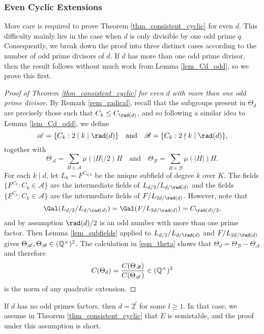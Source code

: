 \subsubsection{Even Cyclic Extensions}
More care is required to prove Theorem \ref{thm_consistent_cyclic} for even $d$. This difficulty mainly lies in the case when $d$ is only divisible by one odd prime $q$. Consequently, we break down the proof into three distinct cases according to the number of odd prime divisors of $d$. If $d$ has more than one odd prime divisor, then the result follows without much work from Lemma \ref{lem_Cd_odd}, so we prove this first.

\begin{proof}[Proof of Theorem \ref{thm_consistent_cyclic} for even $d$ with more than one odd prime divisor]
    By Remark \ref{rem_radical}, recall that the subgroups present in $\Theta_d$ are precisely those such that $C_k\leq C_{\rad(d)}$, and so following a similar idea to Lemma \ref{lem_Cd_odd}, we define
    $$\mathcal{A}=\{C_k :2\mid k\mid\rad(d)\}\quad\text{and}\quad\mathcal{B}=\{C_k:2\nmid k\mid\rad(d)\},$$
    together with
    $$\Theta_\mathcal{A}=\sum_{H\in\mathcal{A}}\mu(|H|/2)H\quad\text{and}\quad\Theta_\mathcal{B}=\sum_{H\in\mathcal{B}}\mu(|H|)H. $$ 
    For each $k\mid d$, let $L_k=F^{C_{d/k}}$ be the unique subfield of degree $k$ over $K$. The fields $\{F^{C_k}:C_k\in\mathcal{A}\}$ are the intermediate fields of $L_{d/2}/L_{d/\rad(d)}$ and the fields $\{F^{C_k}:C_k\in\mathcal{A}\}$ are the intermediate fields of $F/L_{2d/\rad(d)}$. However, note that 
    $$\Gal(L_{d/2}/L_{d/\rad(d)})=\Gal(F/L_{2d/\rad(d)})=C_{\rad(d)/2},$$
    and by assumption $\rad(d)/2$ is an odd number with more than one prime factor. Then Lemma \ref{lem_subfields} applied to $L_{d/2}/L_{d/\rad(d)}$ and $F/L_{2d/\rad(d)}$ gives $\Theta_\mathcal{A},\Theta_\mathcal{B}\in(\mathbb{Q}^{\times})^2$. The calculation in \eqref{eqn_theta} shows that $\Theta_d=\Theta_\mathcal{B}-\Theta_\mathcal{A}$ and therefore 
    $$C(\Theta_d)=\frac{C(\Theta_\mathcal{B})}{C(\Theta_\mathcal{A})}\in(\mathbb{Q}^{\times})^2$$
    is the norm of any quadratic extension.

\end{proof}

If $d$ has no odd primes factors, then $d=2^l$ for some $l\geq1$. In that case, we assume in Theorem \ref{thm_consistent_cyclic} that $E$ is semistable, and the proof under this assumption is short. 

